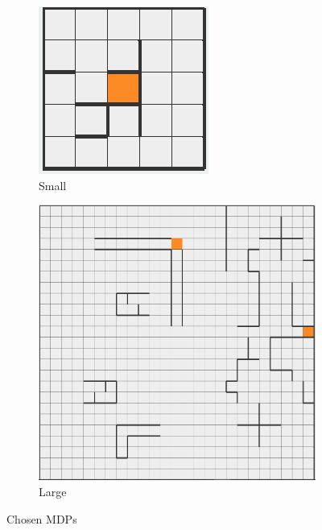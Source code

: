\documentclass[letterpaper]{article}
\begin{document}
	\begin{figure}
		\centering
		\begin{subfigure}{.45\textwidth}
			\centering
			\includegraphics[width=\linewidth]{images/small_mdp}
			\caption{Small}
		\end{subfigure}
		\begin{subfigure}{.45\textwidth}
			\centering
			\includegraphics[width=\linewidth]{images/large_mdp}
			\caption{Large}		
		\end{subfigure}
		\caption{Chosen MDPs}
		\label{fig:mdp-viz}%
	\end{figure}%
\end{document}

